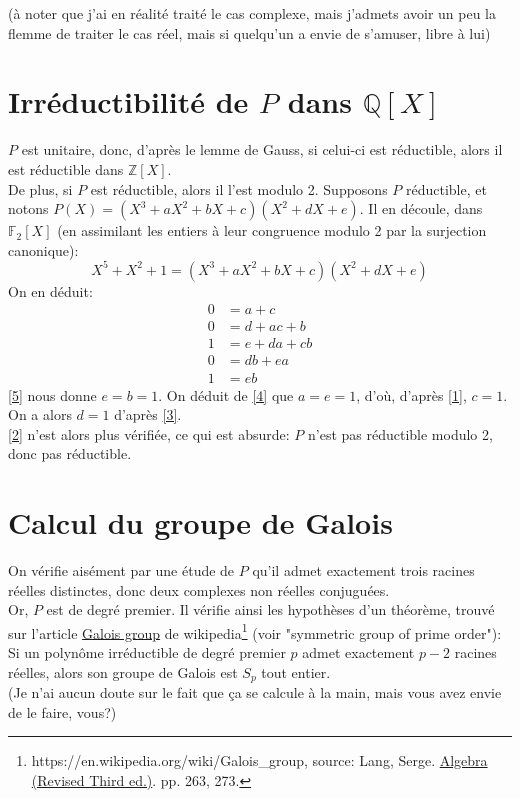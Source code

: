 \documentclass[a4paper, 12pt]{article}
\begin{document}
	(à noter que j'ai en réalité traité le cas complexe, mais j'admets avoir un peu la flemme de traiter le cas réel, mais si quelqu'un a envie de s'amuser, libre à lui)

	\section{Irréductibilité de $P$ dans $\mathbb Q [X]$}
	$P$ est unitaire, donc, d'après le lemme de Gauss\footnotemark, si celui-ci est réductible, alors il est réductible dans $\mathbb Z [X]$.\\
	De plus, si $P$ est réductible, alors il l'est modulo 2. Supposons $P$ réductible, et notons $P(X) = (X^3 + a X^2 + bX + c) (X^2+ dX + e)$. Il en découle, dans $\mathbb F_2[X]$ (en assimilant les entiers à leur congruence modulo 2 par la surjection canonique):
	$$ X^5 + X^2 + 1 = (X^3 + a X^2 + bX + c) (X^2+ dX + e)$$
	On en déduit:
	\begin{align}
		0 & = a+c  \label{1} \\
		0 & = d + ac + b  \label{2} \\
		1 & = e + da + cb  \label{3} \\
		0 & = db + ea \label{4} \\
		1 & = eb  \label{5}
	\end{align}
	\eqref{5} nous donne $e=b=1$. On déduit de \eqref{4} que $a=e=1$, d'où, d'après \eqref{1}, $c=1$. On a alors $d=1$ d'après \eqref{3}. \\
	\eqref{2} n'est alors plus vérifiée, ce qui est absurde: $P$ n'est pas réductible modulo 2, donc pas réductible. \\

	
	\section{Calcul du groupe de Galois}
	On vérifie aisément par une étude de $P$ qu'il admet exactement trois racines réelles distinctes, donc deux complexes non réelles conjuguées. \\
	Or, $P$ est de degré premier. Il vérifie ainsi les hypothèses d'un théorème, trouvé sur l'article \underline{Galois group} de wikipedia\footnote{https://en.wikipedia.org/wiki/Galois\_group, source: Lang, Serge. \underline{Algebra (Revised Third ed.)}. pp. 263, 273.} (voir "symmetric group of prime order"): Si un polynôme irréductible de degré premier $p$ admet exactement $p-2$ racines réelles, alors son groupe de Galois est $S_p$ tout entier.  \\
	(Je n'ai aucun doute sur le fait que ça se calcule à la main, mais vous avez envie de le faire, vous?)
	
\end{document}
